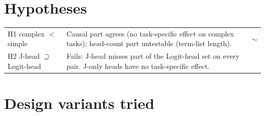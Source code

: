 \documentclass[10pt,a4paper]{article}
\newcommand{\no}{\textcolor{red!70!black}{\ding{55}}}
\newcommand{\mixed}{\textcolor{orange!80!black}{$\sim$}}
\begin{document}
\section{Hypotheses}

\begin{tabularx}{\textwidth}{@{}>{\raggedright\arraybackslash}p{3.6cm}Lc@{}}
\toprule
H1 complex $<$ simple & Causal part agrees (no task-specific effect on complex tasks); head-count part untestable (term-list length). & \mixed \\
H2 J-head $\supseteq$ Logit-head & Fails: J-head misses part of the Logit-head set on every pair. J-only heads have no task-specific effect. & \no \\
\bottomrule
\end{tabularx}

\section{Design variants tried}
\end{document}
